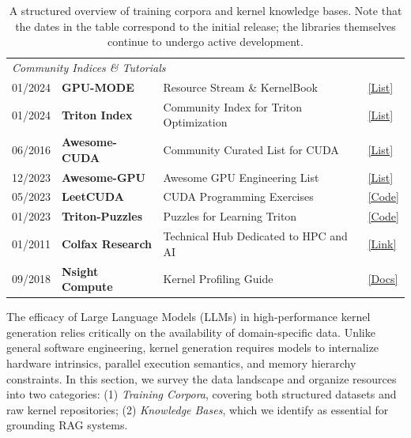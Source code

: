 \begin{table}[h!]
\begin{tabular}{l l p{6.8cm} l}
\multicolumn{4}{l}{\textit{Community Indices \& Tutorials}} \\
01/2024 & \textbf{GPU-MODE} & Resource Stream \& KernelBook & \href{https://github.com/gpu-mode/resource-stream}{[List]} \\
01/2024 & \textbf{Triton Index} & Community Index for Triton Optimization & \href{https://github.com/gpu-mode/triton-index}{[List]} \\
06/2016 & \textbf{Awesome-CUDA} & Community Curated List for CUDA & \href{https://github.com/Erkaman/Awesome-CUDA}{[List]} \\
12/2023 & \textbf{Awesome-GPU} & Awesome GPU Engineering List & \href{https://github.com/goabiaryan/awesome-gpu-engineering}{[List]} \\
05/2023 & \textbf{LeetCUDA} & CUDA Programming Exercises & \href{https://github.com/xlite-dev/LeetCUDA}{[Code]} \\
01/2023 & \textbf{Triton-Puzzles} & Puzzles for Learning Triton & \href{https://github.com/srush/Triton-Puzzles}{[Code]} \\
01/2011 & \textbf{Colfax Research} & Technical Hub Dedicated to HPC and AI & \href{https://research.colfax-intl.com/}{[Link]} \\
09/2018 & \textbf{Nsight Compute} & Kernel Profiling Guide & \href{https://docs.nvidia.com/nsight-compute/}{[Docs]} \\

\bottomrule
\end{tabular}
\caption{A structured overview of training corpora and kernel knowledge bases.  Note that the dates in the table correspond to the initial release; the libraries themselves continue to undergo active development. }
\label{tab:full_resources}
\end{table}

The efficacy of Large Language Models (LLMs) in high-performance kernel generation relies critically on the availability of domain-specific data. Unlike general software engineering, kernel generation requires models to internalize hardware intrinsics, parallel execution semantics, and memory hierarchy constraints. In this section, we survey the data landscape and organize resources into two categories: (1) \textit{Training Corpora}, covering both structured datasets and raw kernel repositories; (2) \textit{Knowledge Bases}, which we identify as essential for grounding RAG systems. 

